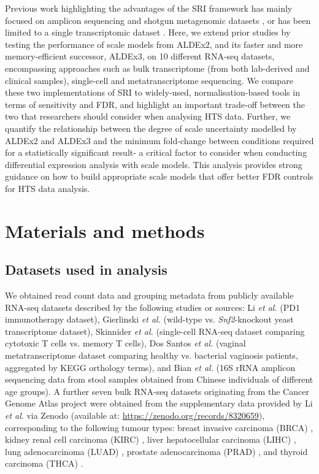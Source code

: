 \documentclass[10pt,letterpaper]{article}
\begin{document}
Previous work highlighting the advantages of the SRI framework has mainly focused on amplicon sequencing and shotgun metagenomic datasets \cite{konnaris_uncertainty_2025}, or has been limited to a single transcriptomic dataset \cite{gloor_explicit_2025}. Here, we extend prior studies by testing the performance of scale models from ALDEx2, and its faster and more memory-efficient successor, ALDEx3, on 10 different RNA-seq datasets, encompassing approaches such as bulk transcriptome (from both lab-derived and clinical samples), single-cell and metatranscriptome sequencing. We compare these two implementations of SRI to widely-used, normalisation-based tools in terms of sensitivity and FDR, and highlight an important trade-off between the two that researchers should consider when analysing HTS data. Further, we quantify the relationship between the degree of scale uncertainty modelled by ALDEx2 and ALDEx3 and the minimum fold-change between conditions required for a statistically significant result- a critical factor to consider when conducting differential expression analysis with scale models. This analysis provides strong guidance on how to build appropriate scale models that offer better FDR controls for HTS data analysis.


\section*{Materials and methods}

\subsection*{Datasets used in analysis}
We obtained read count data and grouping metadata from publicly available RNA-seq datasets described by the following studies or sources: Li \textit{et al.} \cite{li_exaggerated_2022} (PD1 immunotherapy dataset), Gierlinski \textit{et al.} \cite{gierlinski_statistical_2015} (wild-type vs. \textit{Snf2}-knockout yeast transcriptome dataset), Skinnider \textit{et al.} \cite{skinnider_evaluating_2019} (single-cell RNA-seq dataset comparing cytotoxic T cells vs. memory T cells), Dos Santos \textit{et al.} \cite{dos_santos_vaginal_2024} (vaginal metatranscriptome dataset comparing healthy vs. bacterial vaginosis patients, aggregated by KEGG orthology terms), and Bian \textit{et al.} \cite{bian_gut_2017} (16S rRNA amplicon sequencing data from stool samples obtained from Chinese individuals of different age groups). A further seven bulk RNA-seq datasets originating from the Cancer Genome Atlas project \cite{weinstein_cancer_2013} were obtained from the supplementary data provided by Li \textit{et al}. via Zenodo \cite{li_supplement_2022} (available at: \url{https://zenodo.org/records/8320659}), corresponding to the following tumour types: breast invasive carcinoma (BRCA) \cite{tcga_brca_2012,tcga_brca_2015}, kidney renal cell carcinoma (KIRC) \cite{tcga_kirc_2013}, liver hepatocellular carcinoma (LIHC) \cite{tcga_lihc_2017}, lung adenocarcinoma (LUAD) \cite{tcga_luad_2016}, prostate adenocarcinoma (PRAD) \cite{tcga_prad_2015}, and thyroid carcinoma (THCA) \cite{tcga_thca_2014}.
\end{document}
